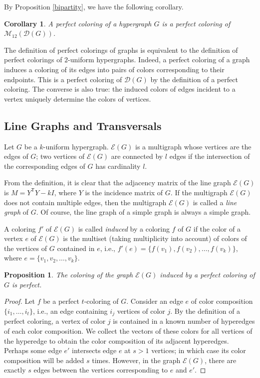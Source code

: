 \documentclass[11pt]{article}
\newtheorem{claim}{Proposition}[section]
\newtheorem{corollary}{Corollary}[section]
\theoremstyle{definition}
\begin{document}
{{{By Proposition \ref{bipartity}, we have the following corollary.
\begin{corollary}
A perfect coloring of a hypergraph $G$ is a perfect coloring
of $\mathcal{M}_{12}(\mathcal{D}(G))$.
\end{corollary}

The definition of  perfect colorings of graphs
is equivalent to the definition of perfect colorings of
$2$-uniform hypergraphs. Indeed, a perfect coloring
of a graph induces a coloring of its edges into pairs of colors corresponding to their
endpoints. This is a perfect coloring of $\mathcal{D}(G)$ by
the definition of a perfect coloring. The converse is also true: the
induced colors of edges incident to a vertex uniquely
determine the colors of  vertices.

\subsection{Line Graphs and Transversals}



Let $G$ be a $k$-uniform hypergraph. 
$\mathcal{E}(G)$ is a multigraph
whose vertices are the edges of $G$; two vertices of
$\mathcal{E}(G)$ are connected by $l$ edges if the intersection
of the corresponding edges of $G$ has cardinality $l$.

From the definition, it is clear that the adjacency matrix of the line graph
$\mathcal{E}(G)$ is $M=Y^{\mathsf T}Y-kI$, where $Y$
is the incidence matrix of $G$. If the multigraph $\mathcal{E}(G)$ does not contain multiple edges, then the multigraph $\mathcal{E}(G)$ is called a {\sl line graph} of $G$.
Of course, the line graph of a simple graph is always a simple graph.

A coloring $f'$ of $\mathcal{E}(G)$ is called {\sl induced} by a coloring $f$ of $G$  if the color of a vertex $e$ of $\mathcal{E}(G)$ is the multiset (taking  multiplicity into account) of colors of the vertices  of $G$ contained in  $e$, i.e., $f'(e) = \{f(v_1),f(v_2),\dots,f(v_k)\}$, where 
$e=\{v_1,v_2,\dots,v_k\}$.

\begin{claim}\label{cl:edge_coloring}
The coloring of the graph $\mathcal{E}(G)$ induced by a perfect
coloring of  $G$ is perfect.
\end{claim}
\begin{proof}
Let $f$ be a perfect $t$-coloring of $G$.
Consider an edge $e$ of color composition $\{i_1,\dots,i_t\}$, i.e., an edge
containing $i_j$ vertices of color $j$. By the definition of a perfect
coloring, a vertex of color $j$ is contained in a known
number of hyperedges of each color composition. We collect the vectors of these
colors for all vertices of the hyperedge to obtain the color composition
of its adjacent hyperedges. Perhaps some edge $e'$ intersects
edge $e$ at $s>1$ vertices; in which case its color composition will be added
$s$ times. However,  in the graph $\mathcal{E}(G)$, there are exactly $s$ edges between the vertices
corresponding to $e$ and $e'$.
\end{proof}


}}}
\end{document}
